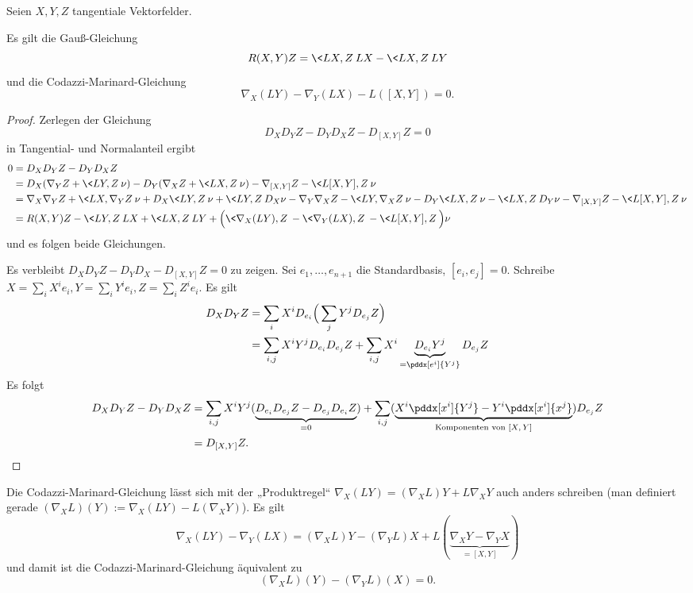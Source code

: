 \begin{nt}
	Seien $X, Y, Z$ tangentiale Vektorfelder.

	Es gilt die Gauß-Gleichung
	\[
		R(X,Y) Z = \<LX, Z\> LX - \< LX, Z\> LY \\
	\]
	und die Codazzi-Marinard-Gleichung
	\[
		\nabla_X(LY) - \nabla_Y(LX) - L([X,Y]) = 0.
	\]
	\begin{proof}
		Zerlegen der Gleichung
		\[
			D_X D_Y Z - D_Y D_X Z - D_{[X,Y]} Z = 0
		\]
		in Tangential- und Normalanteil ergibt
		\begin{align*}
			0 &= D_X D_Y Z - D_Y D_X Z \\
			&= D_X(\nabla_Y Z + \<LY, Z\> \nu) - D_Y(\nabla_X Z + \<LX, Z\> \nu)
				- \nabla_{[X,Y]}Z - \<L[X,Y], Z\> \nu \\
			&= \nabla_X \nabla_Y Z + \<LX, \nabla_Y Z\> \nu + D_X\<LY, Z\> \nu + \< LY, Z\> D_X \nu
				- \nabla_Y \nabla_X Z - \<LY, \nabla_X Z\> \nu - D_Y\<LX, Z\> \nu - \< LX, Z\> D_Y \nu
				- \nabla_{[X,Y]} Z - \<L[X,Y], Z\> \nu \\
			&= R(X, Y) Z - \<LY, Z\>LX + \<LX, Z\>LY + \Big( \<\nabla_X(LY), Z\> - \< \nabla_Y(LX), Z\> - \<L[X,Y], Z\> \Big) \nu
		\end{align*}
		und es folgen beide Gleichungen.

		Es verbleibt $D_X D_Y Z - D_Y D_X - D_{[X,Y]} Z = 0$ zu zeigen.
		Sei $e_1, \dotsc, e_{n+1}$ die Standardbasis, $[e_i, e_j] = 0$.
		Schreibe $X = \sum_i X^i e_i, Y = \sum_i Y^i e_i, Z = \sum_i Z^i e_i$.
		Es gilt
		\begin{align*}
			D_X D_Y Z
			&= \sum_i X^i D_{e_i} \Big(\sum_j Y^j D_{e_j} Z \Big) \\
			&= \sum_{i,j} X^i Y^j D_{e_i} D_{e_j} Z + \sum_{i,j} X^i \underbrace{D_{e_i} Y^j}_{= \pddx[e^i]{Y^j}} D_{e_j} Z
		\end{align*}
		Es folgt
		\begin{align*}
			D_X D_Y Z - D_Y D_X Z
			&= \sum_{i,j} X^i Y^j (\underbrace{D_{e_i} D_{e_j} Z - D_{e_j} D_{e_i} Z}_{=0}) + \sum_{i,j} (\underbrace{ X^i \pddx[x^i]{Y^j} - Y^i \pddx[x^i]{x^j} }_{\text{Komponenten von $[X,Y]$}}) D_{e_j} Z \\
			&= D_{[X,Y]} Z.
		\end{align*}
	\end{proof}
	\begin{note}
		Die Codazzi-Marinard-Gleichung lässt sich mit der „Produktregel“ $\nabla_X(LY) = (\nabla_X L) Y + L \nabla_X Y$ auch anders schreiben (man definiert gerade $(\nabla_X L)(Y) := \nabla_X(LY) - L(\nabla_X Y)$).
		Es gilt
		\[
			\nabla_X(LY) - \nabla_Y(LX)
			= (\nabla_X L) Y - (\nabla_Y L) X + L(\underbrace{\nabla_X Y - \nabla_Y X}_{=[X,Y]})
		\]
		und damit ist die Codazzi-Marinard-Gleichung äquivalent zu
		\[
			(\nabla_X L)(Y) - (\nabla_Y L)(X) = 0.
		\]
	\end{note}
\end{nt}

